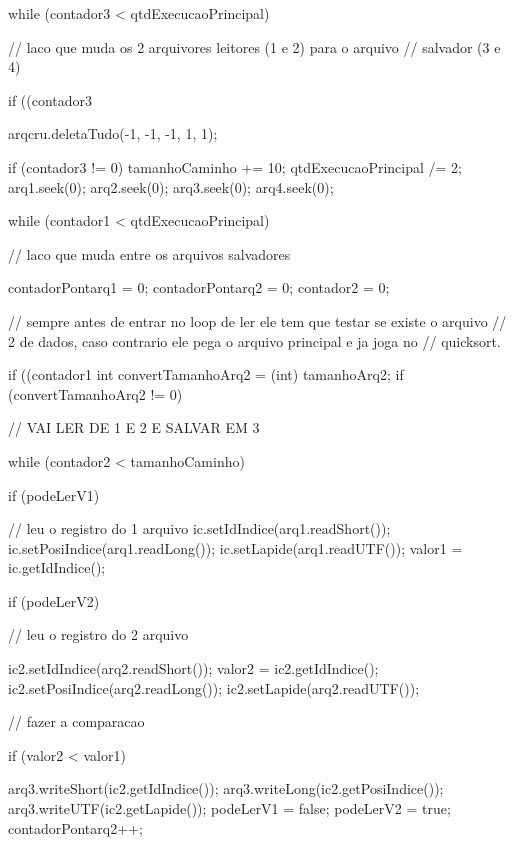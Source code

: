 {{      while (contador3 < qtdExecucaoPrincipal) {// laco que muda os 2 arquivores leitores (1 e 2) para o arquivo
                                                // salvador (3 e 4)

        if ((contador3 %

          arqcru.deletaTudo(-1, -1, -1, 1, 1);

          if (contador3 != 0) {
            tamanhoCaminho += 10;
            qtdExecucaoPrincipal /= 2;
            arq1.seek(0);
            arq2.seek(0);
            arq3.seek(0);
            arq4.seek(0);
          }

          while (contador1 < qtdExecucaoPrincipal) {// laco que muda entre os arquivos salvadores

            contadorPontarq1 = 0;
            contadorPontarq2 = 0;
            contador2 = 0;

            // sempre antes de entrar no loop de ler ele tem que testar se existe o arquivo
            // 2 de dados, caso contrario ele pega o arquivo principal e ja joga no
            // quicksort.

            if ((contador1 %
              int convertTamanhoArq2 = (int) tamanhoArq2;
              if (convertTamanhoArq2 != 0) {// VAI LER DE 1 E 2 E SALVAR EM 3

                while (contador2 < tamanhoCaminho) {

                  if (podeLerV1) {
                    // leu o registro do 1 arquivo
                    ic.setIdIndice(arq1.readShort());
                    ic.setPosiIndice(arq1.readLong());
                    ic.setLapide(arq1.readUTF());
                    valor1 = ic.getIdIndice();

                  }

                  if (podeLerV2) {
                    // leu o registro do 2 arquivo

                    ic2.setIdIndice(arq2.readShort());
                    valor2 = ic2.getIdIndice();
                    ic2.setPosiIndice(arq2.readLong());
                    ic2.setLapide(arq2.readUTF());

                  }

                  // fazer a comparacao

                  if (valor2 < valor1) {

                    arq3.writeShort(ic2.getIdIndice());
                    arq3.writeLong(ic2.getPosiIndice());
                    arq3.writeUTF(ic2.getLapide());
                    podeLerV1 = false;
                    podeLerV2 = true;
                    contadorPontarq2++;

}}}}}}}
